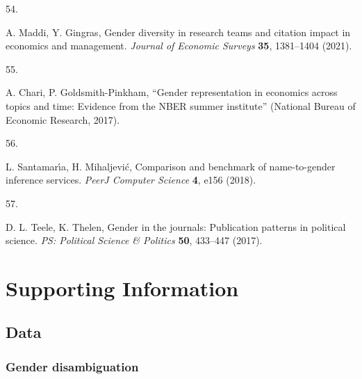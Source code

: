 \documentclass[
  british,
  11pt,
]{article}
\newlength{\cslhangindent}
\newlength{\csllabelwidth}
\newenvironment{CSLReferences}[2] %
 {\begin{list}{}{%
  \setlength{\itemindent}{0pt}
  \setlength{\leftmargin}{0pt}
  \setlength{\parsep}{0pt}
  \ifodd #1
   \setlength{\leftmargin}{\cslhangindent}
   \setlength{\itemindent}{-1\cslhangindent}
  \fi
  \setlength{\itemsep}{#2\baselineskip}}}
 {\end{list}}
\newcommand{\CSLLeftMargin}[1]{\parbox[t]{\csllabelwidth}{\strut#1\strut}}
\newcommand{\CSLRightInline}[1]{\parbox[t]{\linewidth - \csllabelwidth}{\strut#1\strut}}
\begin{document}
\begin{CSLReferences}{0}{1}
\CSLLeftMargin{54. }%
\CSLRightInline{A. Maddi, Y. Gingras, Gender diversity in research teams and citation impact in economics and management. \emph{Journal of Economic Surveys} \textbf{35}, 1381--1404 (2021).}

\CSLLeftMargin{55. }%
\CSLRightInline{A. Chari, P. Goldsmith-Pinkham, {``Gender representation in economics across topics and time: Evidence from the NBER summer institute''} (National Bureau of Economic Research, 2017).}

\CSLLeftMargin{56. }%
\CSLRightInline{L. Santamarı́a, H. Mihaljević, Comparison and benchmark of name-to-gender inference services. \emph{PeerJ Computer Science} \textbf{4}, e156 (2018).}

\CSLLeftMargin{57. }%
\CSLRightInline{D. L. Teele, K. Thelen, Gender in the journals: Publication patterns in political science. \emph{PS: Political Science \& Politics} \textbf{50}, 433--447 (2017).}

\end{CSLReferences}

\newpage
\appendix
\renewcommand{\thefigure}{SI-\arabic{figure}}
\renewcommand{\thesection}{SI}
\renewcommand{\thesubsection}{SI-\arabic{subsection}}

\setcounter{figure}{0}
\setcounter{table}{0}
\setcounter{section}{0}
\setcounter{subsection}{0}
\renewcommand{\thetable}{SI-\arabic{table}}

\section{Supporting Information}\label{supporting-information}

\subsection{Data}\label{data}

\subsubsection{Gender disambiguation}\label{gender-disambiguation}
\end{document}

